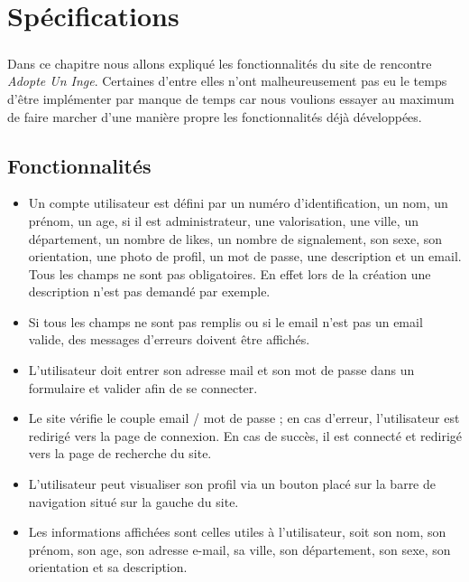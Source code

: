 \chapter{Spécifications}

\paragraph{}
Dans ce chapitre nous allons expliqué les fonctionnalités du site de rencontre \textit{Adopte Un Inge}. Certaines d'entre elles n'ont malheureusement pas eu le temps d'être implémenter par manque de temps car nous voulions essayer au maximum de faire marcher d'une manière propre les fonctionnalités déjà développées.
\section{Fonctionnalités}

\begin{itemize}
 \item Un compte utilisateur est défini par un numéro d'identification, un nom, un prénom, un age, si il est administrateur, une valorisation, une ville, un département, un nombre de likes, un nombre de signalement, son sexe, son orientation, une photo de profil, un mot de passe, une description et un email. Tous les champs ne sont pas obligatoires. En effet lors de la création une description n'est pas demandé par exemple.
 \item Si tous les champs ne sont pas remplis ou si le email n'est pas un email valide, des messages d'erreurs doivent être affichés.
\end{itemize}

\begin{itemize}
 \item L'utilisateur doit entrer son adresse mail et son mot de passe dans un formulaire et valider afin de se connecter.
 \item Le site vérifie le couple email / mot de passe ; en cas d'erreur, l'utilisateur est redirigé vers la page de connexion.
 En cas de succès, il est connecté et redirigé vers la page de recherche du site.
\end{itemize}

\begin{itemize}
 \item L'utilisateur peut visualiser son profil via un bouton placé sur la barre de navigation situé sur la gauche du site.
 \item Les informations affichées sont celles utiles à l'utilisateur, soit son nom, son prénom, son age, son adresse e-mail, sa ville, son département, son sexe, son orientation et sa description.
\end{itemize}

